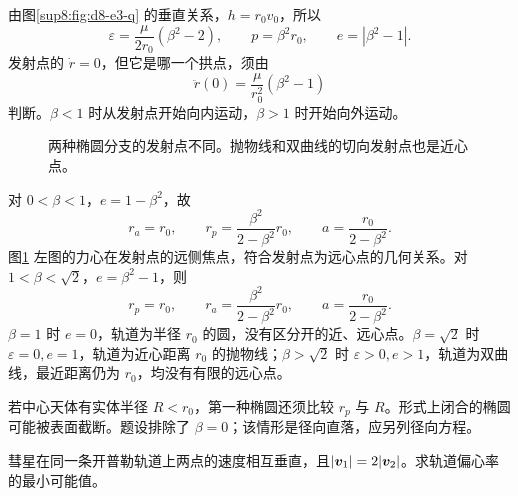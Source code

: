 \begin{solution}
由图\ref{sup8:fig:d8-e3-q} 的垂直关系，$h=r_0v_0$，所以
\[
 \varepsilon=\frac{\mu}{2r_0}(\beta^2-2),\qquad
 p=\beta^2r_0,\qquad e=|\beta^2-1|.
\]
发射点的 $\dot r=0$，但它是哪一个拱点，须由
\[
 \ddot r(0)=\frac{\mu}{r_0^2}(\beta^2-1)
\]
判断。$\beta<1$ 时从发射点开始向内运动，$\beta>1$ 时开始向外运动。
\begin{figure}[H]\centering
{}
\caption{两种椭圆分支的发射点不同。抛物线和双曲线的切向发射点也是近心点。}\label{sup8:fig:d8-e3-s}
\end{figure}
对 $0<\beta<1$，$e=1-\beta^2$，故
\[
 r_a=r_0,\qquad r_p=\frac{\beta^2}{2-\beta^2}r_0,\qquad
 a=\frac{r_0}{2-\beta^2}.
\]
图\ref{sup8:fig:d8-e3-s} 左图的力心在发射点的远侧焦点，符合发射点为远心点的几何关系。对 $1<\beta<\sqrt2$，$e=\beta^2-1$，则
\[
 r_p=r_0,\qquad r_a=\frac{\beta^2}{2-\beta^2}r_0,
 \qquad a=\frac{r_0}{2-\beta^2}.
\]
$\beta=1$ 时 $e=0$，轨道为半径 $r_0$ 的圆，没有区分开的近、远心点。$\beta=\sqrt2$ 时 $\varepsilon=0,e=1$，轨道为近心距离 $r_0$ 的抛物线；$\beta>\sqrt2$ 时 $\varepsilon>0,e>1$，轨道为双曲线，最近距离仍为 $r_0$，均没有有限的远心点。

若中心天体有实体半径 $R<r_0$，第一种椭圆还须比较 $r_p$ 与 $R$。形式上闭合的椭圆可能被表面截断。题设排除了 $\beta=0$；该情形是径向直落，应另列径向方程。
\end{solution}



\begin{example}[垂直速度与二倍速率的最小偏心率]\label{ex:hw8-6}

彗星在同一条开普勒轨道上两点的速度相互垂直，且$|\bm{v}_1|=2|\bm{v}_2|$。求轨道偏心率的最小可能值。

\end{example}


